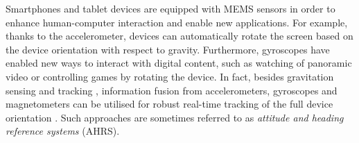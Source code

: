 \documentclass[conference]{ieeetran}
\begin{document}
Smartphones and tablet devices are equipped with MEMS sensors in order to enhance human-computer interaction and enable new applications. For example, thanks to the accelerometer, devices can automatically rotate the screen based on the device orientation with respect to gravity. Furthermore, gyroscopes have enabled new ways to interact with digital content, such as watching of panoramic video or controlling games by rotating the device. In fact, besides gravitation sensing and tracking \cite{Sarkka+Tolvanen+Kannala+Rahtu:2015}, information fusion from accelerometers, gyroscopes and magnetometers can be utilised for robust real-time tracking of the full device orientation \cite{Madgwick+Harrison+Vaidyanathan:2011, Renaudin+Combettes:2014}. Such approaches are sometimes referred to as \emph{attitude and heading reference systems} (AHRS). 
\end{document}
